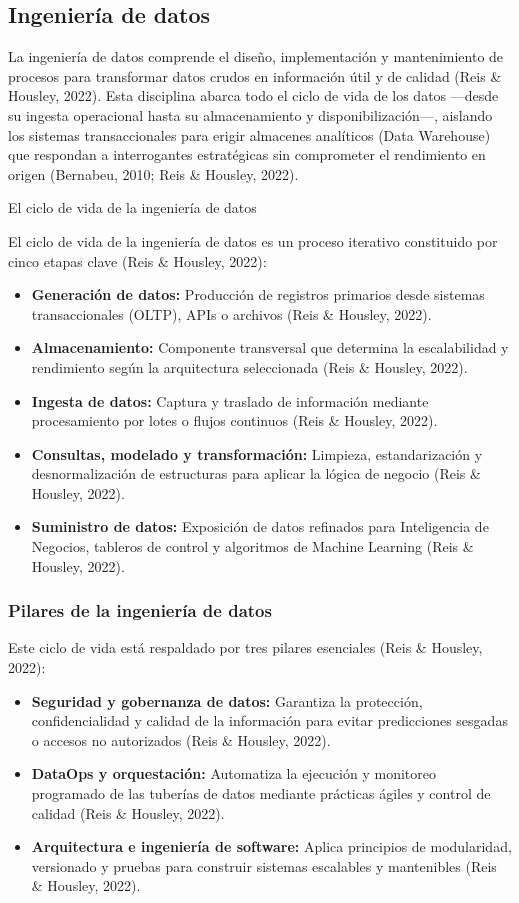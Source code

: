 \documentclass[11pt,oneside,openany]{book}
\begin{document}
\subsection{Ingeniería de datos}

La ingeniería de datos comprende el diseño, implementación y mantenimiento de procesos para transformar datos crudos en información útil y de calidad (Reis \& Housley, 2022). Esta disciplina abarca todo el ciclo de vida de los datos ---desde su ingesta operacional hasta su almacenamiento y disponibilización---, aislando los sistemas transaccionales para erigir almacenes analíticos (Data Warehouse) que respondan a interrogantes estratégicas sin comprometer el rendimiento en origen (Bernabeu, 2010; Reis \& Housley, 2022).

El ciclo de vida de la ingeniería de datos

El ciclo de vida de la ingeniería de datos es un proceso iterativo constituido por cinco etapas clave (Reis \& Housley, 2022):

\begin{itemize}[leftmargin=*]
\item \textbf{Generación de datos:} Producción de registros primarios desde sistemas transaccionales (OLTP), APIs o archivos (Reis \& Housley, 2022).
\item \textbf{Almacenamiento:} Componente transversal que determina la escalabilidad y rendimiento según la arquitectura seleccionada (Reis \& Housley, 2022).
\item \textbf{Ingesta de datos:} Captura y traslado de información mediante procesamiento por lotes o flujos continuos (Reis \& Housley, 2022).
\item \textbf{Consultas, modelado y transformación:} Limpieza, estandarización y desnormalización de estructuras para aplicar la lógica de negocio (Reis \& Housley, 2022).
\item \textbf{Suministro de datos:} Exposición de datos refinados para Inteligencia de Negocios, tableros de control y algoritmos de Machine Learning (Reis \& Housley, 2022).
\end{itemize}
\subsubsection*{Pilares de la ingeniería de datos}

Este ciclo de vida está respaldado por tres pilares esenciales (Reis \& Housley, 2022):

\begin{itemize}[leftmargin=*]
\item \textbf{Seguridad y gobernanza de datos:} Garantiza la protección, confidencialidad y calidad de la información para evitar predicciones sesgadas o accesos no autorizados (Reis \& Housley, 2022).
\item \textbf{DataOps y orquestación:} Automatiza la ejecución y monitoreo programado de las tuberías de datos mediante prácticas ágiles y control de calidad (Reis \& Housley, 2022).
\item \textbf{Arquitectura e ingeniería de software:} Aplica principios de modularidad, versionado y pruebas para construir sistemas escalables y mantenibles (Reis \& Housley, 2022).
\end{itemize}
\end{document}
